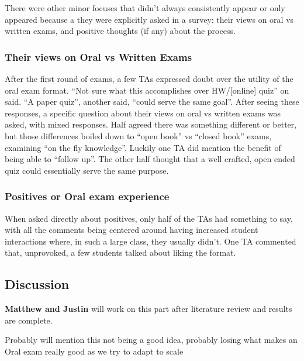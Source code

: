 \documentclass[
  letterpaper,
  DIV=11,
  numbers=noendperiod]{scrartcl}
\begin{document}
There were other minor focuses that didn't always consistently appear or
only appeared because a they were explicitly asked in a survey: their
views on oral vs written exams, and positive thoughts (if any) about the
process.

\hypertarget{their-views-on-oral-vs-written-exams}{%
\subsubsection{Their views on Oral vs Written
Exams}\label{their-views-on-oral-vs-written-exams}}

After the first round of exams, a few TAs expressed doubt over the
utility of the oral exam format. ``Not sure what this accomplishes over
HW/{[}online{]} quiz'' on said. ``A paper quiz'', another said, ``could
serve the same goal''. After seeing these responses, a specific question
about their views on oral vs written exams was asked, with mixed
responses. Half agreed there was something different or better, but
those differences boiled down to ``open book'' vs ``closed book'' exams,
examining ``on the fly knowledge''. Luckily one TA did mention the
benefit of being able to ``follow up''. The other half thought that a
well crafted, open ended quiz could essentially serve the same purpose.

\hypertarget{positives-or-oral-exam-experience}{%
\subsubsection{Positives or Oral exam
experience}\label{positives-or-oral-exam-experience}}

When asked directly about positives, only half of the TAs had something
to say, with all the comments being centered around having increased
student interactions where, in such a large class, they usually didn't.
One TA commented that, unprovoked, a few students talked about liking
the format.

\hypertarget{discussion}{%
\subsection{Discussion}\label{discussion}}

\textbf{Matthew and Justin} will work on this part after literature
review and results are complete.

Probably will mention this not being a good idea, probably losing what
makes an Oral exam really good as we try to adapt to scale
\end{document}
